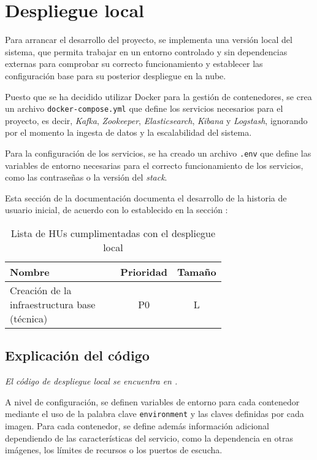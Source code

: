 \section{Despliegue local}\label{sec:impl_local}
Para arrancar el desarrollo del proyecto, se implementa una versión local del
sistema, que permita trabajar en un entorno controlado y sin dependencias
externas para comprobar su correcto funcionamiento y establecer
las configuración base para su posterior despliegue en la nube.

Puesto que se ha decidido utilizar Docker para la gestión de contenedores, se
crea un archivo \texttt{docker-compose.yml} que define los servicios
necesarios para el proyecto, es decir, \textit{Kafka}, \textit{Zookeeper},
\textit{Elasticsearch}, \textit{Kibana} y \textit{Logstash}, ignorando por
el momento la ingesta de datos y la escalabilidad del sistema.

Para la configuración de los servicios, se ha creado un archivo \texttt{.env}
que define las variables de entorno necesarias para el correcto funcionamiento
de los servicios, como las contraseñas o la versión del \textit{stack}.

Esta sección de la documentación documenta el desarrollo de la historia de
usuario inicial, de acuerdo con lo establecido en la sección :

\begin{table}[H]
	\centering
	\begin{tabular}{|p{0.7\linewidth}|c|c|}
		\hline
		\textbf{Nombre} & \textbf{Prioridad} & \textbf{Tamaño} \\
		\hline
		\hline
		Creación de la infraestructura base (técnica) & P0\cellcolor{red!50} & L\cellcolor{orange!50} \\
		\hline
  	\end{tabular}
  	\caption{Lista de HUs cumplimentadas con el despliegue local}
  	\label{tab:impl_local}
\end{table}


\newpage{}
\subsection{Explicación del código}
\emph{El código de despliegue local se encuentra en .}

A nivel de configuración, se definen variables de entorno para cada contenedor
mediante el uso de la palabra clave \texttt{environment} y las claves definidas
por cada imagen. Para cada contenedor, se define además información adicional
dependiendo de las características del servicio, como la dependencia en otras
imágenes, los límites de recursos o los puertos de escucha.

